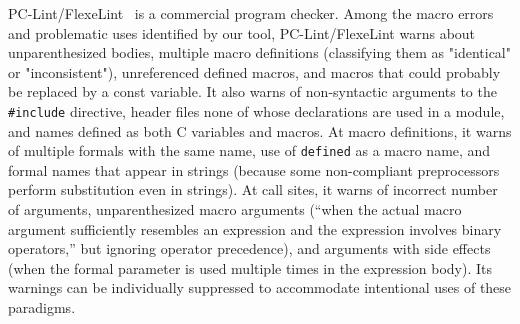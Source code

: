 \documentclass[10pt]{article}
\begin{document}


PC-Lint/FlexeLint~\cite{Gimpel} is a commercial program checker.  Among the
macro errors and problematic uses identified by our tool, PC-Lint/FlexeLint
warns about unparenthesized bodies, multiple macro definitions (classifying
them as "identical" or "inconsistent"), unreferenced defined macros, and
macros that could probably be replaced by a const variable.  It also warns
of non-syntactic arguments to the {\tt \#include} directive, header files
none of whose declarations are used in a module, and names defined as both
C variables and macros.  At macro definitions, it warns of multiple formals
with the same name, use of {\tt defined} as a macro name, and formal names
that appear in strings (because some non-compliant preprocessors perform
substitution even in strings).  At call sites, it warns of incorrect number
of arguments, unparenthesized macro arguments (``when the actual macro
argument sufficiently resembles an expression and the expression involves
binary operators,'' but ignoring operator precedence), and arguments with
side effects (when the formal parameter is used multiple times in the
expression body).  Its warnings can be individually suppressed to
accommodate intentional uses of these paradigms.
\end{document}
